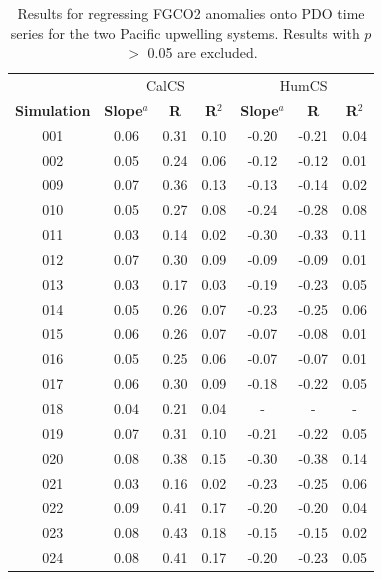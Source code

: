 \documentclass[12pt]{article}
\begin{document}
\newpage
\begin{table}[!h]
	\centering
	\caption{Results for regressing FGCO2 anomalies onto PDO time series for the two Pacific upwelling systems. Results with $p$ $>$ 0.05 are excluded.}
	\begin{tabular}{c c c c | c c c}
		& \multicolumn{3}{c}{CalCS} & \multicolumn{3}{c}{HumCS} \\
		\cmidrule{2-4}\cmidrule{5-7}
		\textbf{Simulation} &  \textbf{Slope}$^{a}$  &  \textbf{R} &  \textbf{R$^{2}$} &  \textbf{Slope}$^{a}$  &  \textbf{R} &  \textbf{R$^{2}$}  \\
		\midrule
		001 &   0.06 &     0.31 &       0.10 &  -0.20 &    -0.21 &       0.04 \\
		002 &   0.05 &     0.24 &       0.06 &  -0.12 &    -0.12 &       0.01 \\
		009 &   0.07 &     0.36 &       0.13 &  -0.13 &    -0.14 &       0.02 \\
		010 &   0.05 &     0.27 &       0.08 &  -0.24 &    -0.28 &       0.08 \\
		011 &   0.03 &     0.14 &       0.02 &  -0.30 &    -0.33 &       0.11 \\
		012 &   0.07 &     0.30 &       0.09 &  -0.09 &    -0.09 &       0.01 \\
		013 &   0.03 &     0.17 &       0.03 &  -0.19 &    -0.23 &       0.05 \\
		014 &   0.05 &     0.26 &       0.07 &  -0.23 &    -0.25 &       0.06 \\
		015 &   0.06 &     0.26 &       0.07 &  -0.07 &    -0.08 &       0.01 \\
		016 &   0.05 &     0.25 &       0.06 &  -0.07 &    -0.07 &       0.01 \\
		017 &   0.06 &     0.30 &       0.09 &  -0.18 &    -0.22 &       0.05 \\
		018 &   0.04 &     0.21 &       0.04 &    - &      - &        - \\
		019 &   0.07 &     0.31 &       0.10 &  -0.21 &    -0.22 &       0.05 \\
		020 &   0.08 &     0.38 &       0.15 &  -0.30 &    -0.38 &       0.14 \\
		021 &   0.03 &     0.16 &       0.02 &  -0.23 &    -0.25 &       0.06 \\
		022 &   0.09 &     0.41 &       0.17 &  -0.20 &    -0.20 &       0.04 \\
		023 &   0.08 &     0.43 &       0.18 &  -0.15 &    -0.15 &       0.02 \\
		024 &   0.08 &     0.41 &       0.17 &  -0.20 &    -0.23 &       0.05 \\

\end{tabular}
\end{table}
\end{document}

